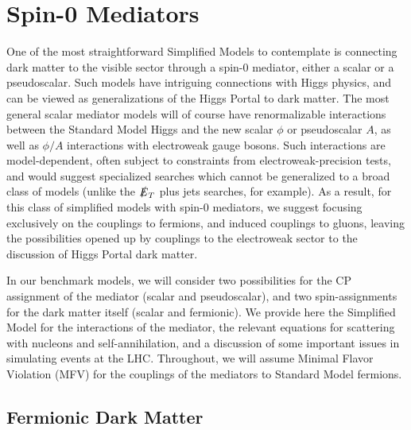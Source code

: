 \section{Spin-0 Mediators}\label{sec:scalar}

One of the most straightforward Simplified Models to contemplate is connecting dark matter to the visible sector through a spin-0 mediator, either a scalar or a pseudoscalar. Such models have intriguing connections with Higgs physics, and can be viewed as generalizations of the Higgs Portal to dark matter. The most general scalar mediator models will of course have renormalizable interactions between the Standard Model Higgs and the new scalar $\phi$ or pseudoscalar $A$, as well as $\phi/A$ interactions with electroweak gauge bosons. Such interactions are model-dependent, often subject to constraints from electroweak-precision tests, and would suggest specialized searches which cannot be generalized to a broad class of models (unlike the $\slashed{E}_T$ plus jets searches, for example). As a result, for this class of simplified models with spin-0 mediators, we suggest focusing exclusively on the couplings to fermions, and induced couplings to gluons, leaving the possibilities opened up by couplings to the electroweak sector to the discussion of Higgs Portal dark matter.

In our benchmark models, we will consider two possibilities for the CP assignment of the mediator (scalar and pseudoscalar), and two spin-assignments for the dark matter itself (scalar and fermionic). We provide here the Simplified Model for the interactions of the mediator, the relevant equations for scattering with nucleons and self-annihilation, and a discussion of some important issues in simulating events at the LHC. Throughout, we will assume Minimal Flavor Violation (MFV) for the couplings of the mediators to Standard Model fermions.

\subsection{Fermionic Dark Matter}

